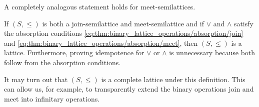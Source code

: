 \begin{proposition}
\begin{thmenum}
    A completely analogous statement holds for meet-semilattices.

    If \( (S, \leq) \) is both a join-semilattice and meet-semilattice and if \( \vee \) and \( \wedge \) satisfy the absorption conditions \eqref{eq:thm:binary_lattice_operations/absorption/join} and \eqref{eq:thm:binary_lattice_operations/absorption/meet}, then \( (S, \leq) \) is a lattice. Furthermore, proving idempotence for \( \vee \) or \( \wedge \) is unnecessary because both follow from the absorption conditions.

    It may turn out that \( (S, \leq) \) is a complete lattice under this definition. This can allow us, for example, to transparently extend the binary operations join and meet into infinitary operations.
  \end{thmenum}
\end{proposition}
